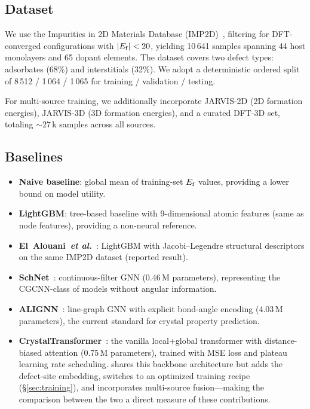 
\subsection{Dataset}

We use the Impurities in 2D Materials Database
(IMP2D)~\cite{imp2d2023}, filtering for DFT-converged configurations with
$|E_\mathrm{f}| < 20$\eV{}, yielding 10\,641 samples spanning 44 host monolayers and
65 dopant elements.
The dataset covers two defect types: adsorbates (68\%) and interstitials
(32\%).
We adopt a deterministic ordered split of 8\,512 / 1\,064 / 1\,065 for
training / validation / testing.

For multi-source training, we additionally incorporate JARVIS-2D (2D
formation energies), JARVIS-3D (3D formation energies), and a curated DFT-3D
set, totaling ${\sim}27$\,k samples across all sources.

\subsection{Baselines}

\begin{itemize}
  \item \textbf{Naive baseline}: global mean of training-set $E_\mathrm{f}$ values,
    providing a lower bound on model utility.
  \item \textbf{LightGBM}: tree-based baseline with 9-dimensional atomic
    features (same as \dart{} node features), providing a non-neural reference.
  \item \textbf{El~Alouani~\textit{et al.}}~\cite{elalouani2024}:
    LightGBM with Jacobi--Legendre structural descriptors on the same
    IMP2D dataset (reported result).
  \item \textbf{SchNet}~\cite{schutt2018}: continuous-filter GNN
    (0.46\,M parameters), representing the CGCNN-class of models without
    angular information.
  \item \textbf{ALIGNN}~\cite{alignn2021}: line-graph GNN with explicit
    bond-angle encoding (4.03\,M parameters), the current standard for
    crystal property prediction.
  \item \textbf{CrystalTransformer}~\cite{crystalformer2024}: the vanilla
    local+global transformer with distance-biased attention
    (0.75\,M parameters), trained with MSE loss and plateau learning rate
    scheduling.
    \dart{} shares this backbone architecture but adds the defect-site
    embedding, switches to an optimized training recipe
    (\S\ref{sec:training}), and incorporates multi-source fusion---making
    the comparison between the two a direct measure of these contributions.
\end{itemize}

